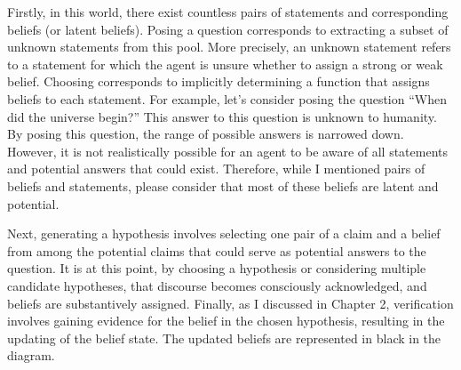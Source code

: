 \documentclass{book}
\begin{document}
Firstly, in this world, there exist countless pairs of statements and corresponding beliefs (or latent beliefs). Posing a question corresponds to extracting a subset of unknown statements from this pool. More precisely, an unknown statement refers to a statement for which the agent is unsure whether to assign a strong or weak belief. Choosing corresponds to implicitly determining a function that assigns beliefs to each statement. For example, let's consider posing the question ``When did the universe begin?'' This answer to this question is unknown to humanity. By posing this question, the range of possible answers is narrowed down. However, it is not realistically possible for an agent to be aware of all statements and potential answers that could exist. Therefore, while I mentioned pairs of beliefs and statements, please consider that most of these beliefs are latent and potential.

Next, generating a hypothesis involves selecting one pair of a claim and a belief from among the potential claims that could serve as potential answers to the question. It is at this point, by choosing a hypothesis or considering multiple candidate hypotheses, that discourse becomes consciously acknowledged, and beliefs are substantively assigned. Finally, as I discussed in Chapter 2, verification involves gaining evidence for the belief in the chosen hypothesis, resulting in the updating of the belief state. The updated beliefs are represented in black in the diagram.
\end{document}
